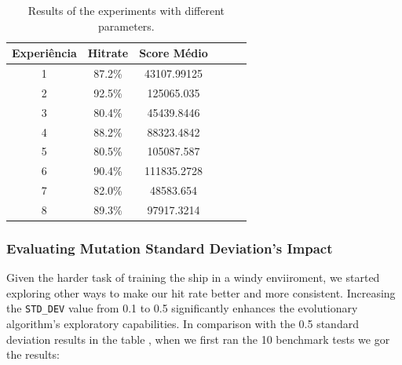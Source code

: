 \documentclass[a4paper, 12pt, fleqn]{report}
\begin{document}
        \begin{table}[H]
        \centering
        \begin{tabular}{|c|c|c|c|c|c|}
        \hline
        \textbf{Experiência} & \textbf{Hitrate} & \textbf{Score Médio} \\
        \hline
                    1 & 87.2\% & 43107.99125  \\
        \hline
                    2 & 92.5\% & 125065.035  \\
        \hline
                    3 & 80.4\% & 45439.8446  \\
        \hline
                    4 & 88.2\% & 88323.4842 \\
        \hline
                    5 & 80.5\% & 105087.587 \\
        \hline
                    6 & 90.4\% &  111835.2728 \\
        \hline
                    7 & 82.0\%  & 48583.654 \\
        \hline
                    8 & 89.3\% &  97917.3214 \\
        \hline
        \end{tabular}
        \caption{Results of the experiments with different parameters.}
        \label{tab:experiments2}
    \end{table}


    \subsubsection*{Evaluating Mutation Standard Deviation's Impact}
    
    Given the harder task of training the ship in a windy enviiroment, we started exploring other ways to make our hit rate better and more consistent. Increasing the \texttt{STD\_DEV} value from 0.1 to 0.5 significantly enhances the evolutionary algorithm's exploratory capabilities. 
    In comparison with the 0.5 standard deviation results in the table , when we first ran the 10 benchmark tests we gor the results:\\
\end{document}
